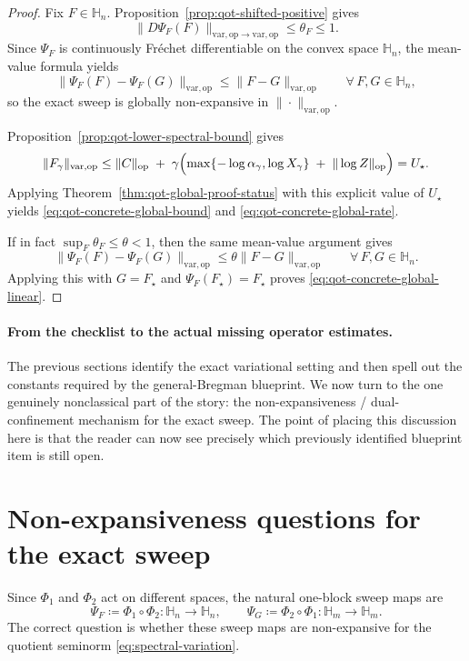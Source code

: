 \documentclass[11pt]{article}
\newcommand{\eqdef}{\coloneqq}
\newcommand{\Hh}{\mathbb{H}}
\newcommand{\op}{\mathrm{op}}
\newcommand{\varop}{\mathrm{var},\op}
\theoremstyle{plain}
\begin{document}
\begin{proof}
Fix $F\in \Hh_n$.
Proposition~\ref{prop:qot-shifted-positive} gives
\[
\|D\Psi_F(F)\|_{\varop\to\varop}\le \theta_F\le 1.
\]
Since $\Psi_F$ is continuously Fr\'echet differentiable on the convex space $\Hh_n$, the mean-value formula yields
\[
\|\Psi_F(F)-\Psi_F(G)\|_{\varop}\le \|F-G\|_{\varop}
\qquad \forall\, F,G\in \Hh_n,
\]
so the exact sweep is globally non-expansive in $\|\cdot\|_{\varop}$.

Proposition~\ref{prop:qot-lower-spectral-bound} gives
\[
\|F_\gamma\|_{\varop}
\le
\|C\|_{\op}
\;+\;
\gamma\Bigl(
\max\{-\log \alpha_\gamma,\log X_\gamma\}
\;+\;
\|\log Z\|_{\op}
\Bigr)
=U_\star.
\]
Applying Theorem~\ref{thm:qot-global-proof-status} with this explicit value of $U_\star$ yields
\eqref{eq:qot-concrete-global-bound} and \eqref{eq:qot-concrete-global-rate}.

If in fact $\sup_F\theta_F\le \theta<1$, then the same mean-value argument gives
\[
\|\Psi_F(F)-\Psi_F(G)\|_{\varop}\le \theta\|F-G\|_{\varop}
\qquad \forall\, F,G\in \Hh_n.
\]
Applying this with $G=F_\star$ and $\Psi_F(F_\star)=F_\star$ proves
\eqref{eq:qot-concrete-global-linear}.
\end{proof}

\paragraph{From the checklist to the actual missing operator estimates.}
The previous sections identify the exact variational setting and then spell out the constants required by the general-Bregman blueprint. We now turn to the one genuinely nonclassical part of the story: the non-expansiveness / dual-confinement mechanism for the exact sweep. The point of placing this discussion here is that the reader can now see precisely which previously identified blueprint item is still open.

\section{Non-expansiveness questions for the exact sweep}

Since $\Phi_1$ and $\Phi_2$ act on different spaces, the natural one-block sweep maps are
\[
\Psi_F \eqdef \Phi_1 \circ \Phi_2 : \Hh_n \to \Hh_n,
\qquad
\Psi_G \eqdef \Phi_2 \circ \Phi_1 : \Hh_m \to \Hh_m.
\]
The correct question is whether these sweep maps are non-expansive for the quotient seminorm \eqref{eq:spectral-variation}.
\end{document}
